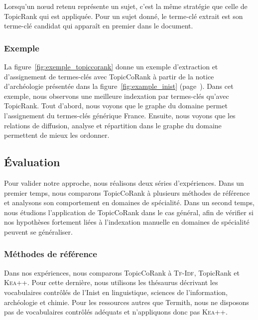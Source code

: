         Lorsqu'un n\oe{}ud retenu représente un sujet, c'est la même stratégie
        que celle de Topic\-Rank qui est appliquée. Pour un sujet donné, le
        terme-clé extrait est son terme-clé candidat qui apparaît en premier
        dans le document.

      \subsubsection{Exemple}
      \label{subsubsec:main-domain_specific_keyphrase_annotation-supervised_automatic_keyphrase_extraction-topiccorank-exemple}
        La figure~\ref{fig:exemple_topiccorank} donne un exemple d'extraction
        et d'assignement de
        termes-clés avec TopicCoRank à partir de la notice d'archéologie
        présentée dans la figure~\ref{fig:example_inist} (page~\pageref{fig:example_inist}). Dans cet exemple,
        nous observons une meilleure indexation par termes-clés qu'avec
        TopicRank. Tout d'abord, nous voyons que le graphe du domaine permet
        l'assignement du termes-clés générique \og{}France\fg{}. Ensuite, nous
        voyons que les relations de \og{}diffusion\fg{}, \og{}analyse\fg{} et
        \og{}répartition\fg{} dans le graphe du domaine permettent de mieux les
        ordonner.
        

    \subsection{Évaluation}
    \label{subsec:main-domain_specific_keyphrase_annotation-supervised_automatic_keyphrase_annotation-evaluation}
      Pour valider notre approche, nous réalisons deux séries d'expériences.
      Dans un premier temps, nous comparons TopicCoRank à plusieurs méthodes de
      référence et analysons son comportement en domaines de spécialité. Dans
      un second temps, nous étudions l'application de TopicCoRank dans le cas
      général, afin de vérifier si nos hypothèses fortement liées à l'indexation
      manuelle en domaines de spécialité peuvent se généraliser.

      \subsubsection{Méthodes de référence}
      \label{subsubsec:main-domain_specific_keyphrase_annotation-supervised_automatic_keyphrase_annotation-evaluation-baselines}
        Dans nos expériences, nous comparons TopicCoRank à \textsc{Tf-Idf},
        TopicRank et \textsc{Kea++}. Pour cette dernière, nous utilisons les
        thésaurus décrivant les vocabulaires contrôlés de l'Inist en
        linguistique, sciences de l'information, archéologie et chimie. Pour les
        ressources autres que Termith, nous ne disposons pas de vocabulaires
        contrôlés adéquats et n'appliquons donc pas \textsc{Kea++}.

